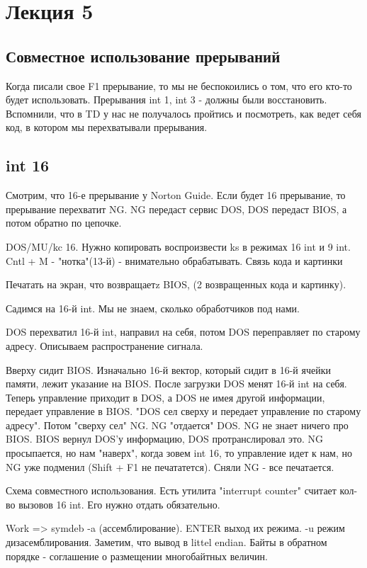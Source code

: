 \section{Лекция 5}
\subsection{Совместное использование прерываний}
Когда писали свое F1 прерывание, то мы не беспокоились о том, что его кто-то будет использовать. Прерывания int 1, int 3 - должны были восстановить. Вспомнили, что в TD у нас не получалось пройтись и посмотреть, как ведет себя код, в котором мы перехватывали прерывания.

\subsection{int 16}
Смотрим, что 16-е прерывание у Norton Guide. Если будет 16 прерывание, то прерывание перехватит NG. NG передаст сервис DOS, DOS передаст BIOS, а потом обратно по цепочке.

\begin{hw} DOS/MU/kc 16. Нужно копировать воспроизвести ks в режимах 16 int и  9 int. Cntl + M - "нотка"(13-й) - внимательно обрабатывать. Связь кода и картинки\end{hw} 
Печатать на экран, что возвращаетz BIOS, (2 возвращенных кода и картинку).

\begin{rem}Садимся на 16-й int. Мы не знаем, сколько обработчиков под нами.\end{rem}
DOS перехватил 16-й int, направил на себя, потом DOS переправляет по старому адресу. Описываем распространение сигнала. 

Вверху сидит BIOS. Изначально 16-й вектор, который сидит в 16-й ячейки памяти, лежит указание на BIOS. После загрузки DOS менят 16-й int на себя. Теперь управление приходит в DOS, а DOS не имея другой информации,  передает управление в BIOS. "DOS сел сверху и передает управление по старому адресу". Потом "сверху сел" NG. NG "отдается" DOS. NG не знает ничего про BIOS. BIOS вернул DOS'у информацию, DOS протранслировал это. NG просыпается, но нам "наверх", когда зовем int 16, то управление идет к нам, но NG уже подменил (Shift + F1 не печататется). Сняли NG - все печатается.  

Схема совместного использования.
Есть утилита "interrupt counter" считает кол-во вызовов 16 int.  Его нужно отдать обязательно.

Work => symdeb -a (ассемблирование). ENTER выход их режима. -u режим дизасемблирования. Заметим, что вывод в littel endian. Байты в обратном порядке - соглашение о размещении многобайтных величин.

